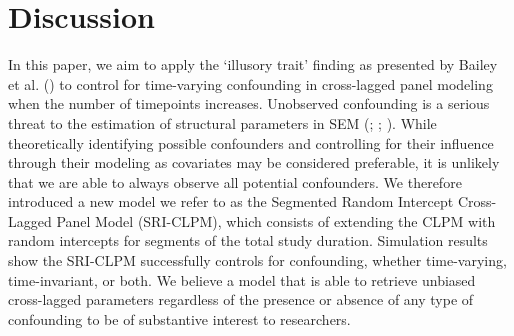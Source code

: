 \documentclass[
  man,
  floatsintext,
  longtable,
  nolmodern,
  notxfonts,
  notimes,
  colorlinks=true,linkcolor=blue,citecolor=blue,urlcolor=blue]{apa7}
\begin{document}
\newpage

\section{Discussion}\label{discussion}

In this paper, we aim to apply the `illusory trait' finding as presented
by Bailey et al. () to
control for time-varying confounding in cross-lagged panel modeling when
the number of timepoints increases. Unobserved confounding is a serious
threat to the estimation of structural parameters in SEM
(; ;
).
While theoretically identifying possible confounders and controlling for
their influence through their modeling as covariates may be considered
preferable, it is unlikely that we are able to always observe all
potential confounders. We therefore introduced a new model we refer to
as the Segmented Random Intercept Cross-Lagged Panel Model (SRI-CLPM),
which consists of extending the CLPM with random intercepts for segments
of the total study duration. Simulation results show the SRI-CLPM
successfully controls for confounding, whether time-varying,
time-invariant, or both. We believe a model that is able to retrieve
unbiased cross-lagged parameters regardless of the presence or absence
of any type of confounding to be of substantive interest to researchers.
\end{document}
